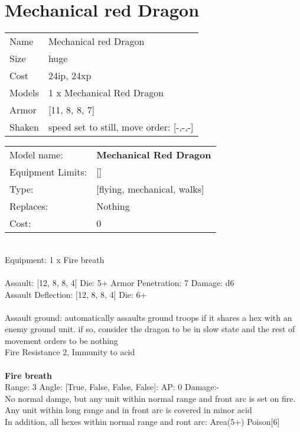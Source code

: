 \pagebreak

\section{ Mechanical red Dragon }

\begin{tabular}{ll}
  Name & Mechanical red Dragon \\
  Size & huge\\
  Cost & 24ip, 24xp\\
  Models & 1 x Mechanical Red Dragon\\
  Armor & [11, 8, 8, 7]\\
  Shaken & speed set to still, move order: [-,-,-]\\
\end{tabular}

\noindent 

\noindent
\begin{tabular}{ll}
Model name: &{\bf Mechanical Red Dragon } \\
Equipment Limits: &[] \\
Type: &[flying, mechanical, walks] \\
Replaces: &Nothing \\
Cost: & 0\\
\end{tabular}
\ \\
Equipment: 1 x Fire breath \\
\ \\
Assault: [12, 8, 8, 4] Die: 5+ Armor Penetration: 7 Damage: d6 \\
Assault Deflection: [12, 8, 8, 4] Die: 6+\\
\indent  
\ \\
Assault ground: automatically assaults ground troops if it shares a hex with an enemy ground unit. if so, consider the dragon to be in slow state and the rest of movement orders to be nothing\\ 
Fire Resistance 2, Immunity to acid\\ 

\ \\
{\bf Fire breath } \\



Range: 3  Angle: [True, False, False, False]: AP: 0 Damage:- \\
No normal damge, but any unit within normal range and front arc is set on fire. Any unit within long range and in front arc is covered in minor acid\\ 
In addition, all hexes within normal range and ront arc: Area(5+) Poison[6]\\ 




